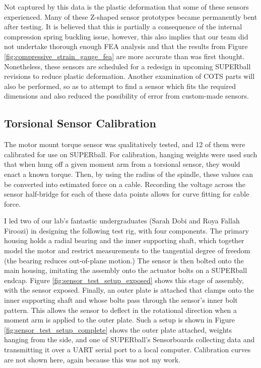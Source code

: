 \documentclass[12pt]{report}
\begin{document}
Not captured by this data is the plastic deformation that some of these sensors experienced.
Many of these Z-shaped sensor prototypes became permanently bent after testing.
It is believed that this is partially a consequence of the internal compression spring buckling issue, however, this also implies that our team did not undertake thorough enough FEA analysis and that the results from Figure \ref{fig:compressive_strain_gauge_fea} are more accurate than was first thought.
Nonetheless, these sensors are scheduled for a redesign in upcoming SUPERball revisions to reduce plastic deformation.
Another examination of COTS parts will also be performed, so as to attempt to find a sensor which fits the required dimensions and also reduced the possibility of error from custom-made sensors.

\subsection{Torsional Sensor Calibration}

The motor mount torque sensor was qualitatively tested, and 12 of them were calibrated for use on SUPERball.
For calibration, hanging weights were used such that when hung off a given moment arm from a torsional sensor, they would enact a known torque.
Then, by using the radius of the spindle, these values can be converted into estimated force on a cable.
Recording the voltage across the sensor half-bridge for each of these data points allows for curve fitting for cable force.

I led two of our lab's fantastic undergraduates (Sarah Dobi and Roya Fallah Firoozi) in designing the following test rig, with four components.
The primary housing holds a radial bearing and the inner supporting shaft, which together model the motor and restrict measurements to the tangential degree of freedom (the bearing reduces out-of-plane motion.)
The sensor is then bolted onto the main housing, imitating the assembly onto the actuator bolts on a SUPERball endcap.
Figure \ref{fig:sensor_test_setup_exposed} shows this stage of assembly, with the sensor exposed.
Finally, an outer plate is attached that clamps onto the inner supporting shaft and whose bolts pass through the sensor's inner bolt pattern.
This allows the sensor to deflect in the rotational direction when a moment arm is applied to the outer plate.
Such a setup is shown in Figure \ref{fig:sensor_test_setup_complete} shows the outer plate attached, weights hanging from the side, and one of SUPERball's Sensorboards collecting data and transmitting it over a UART serial port to a local computer.
Calibration curves are not shown here, again because this was not my work.
\end{document}
